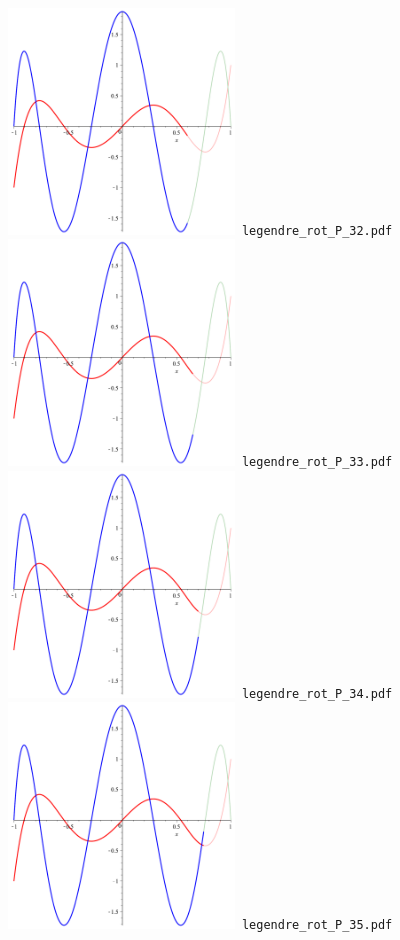 \documentclass[a4paper]{amsart}
\begin{document}
\includegraphics[width=6cm]{legendre_rot_P_32.pdf}\verb+ legendre_rot_P_32.pdf+\\
\includegraphics[width=6cm]{legendre_rot_P_33.pdf}\verb+ legendre_rot_P_33.pdf+\\
\includegraphics[width=6cm]{legendre_rot_P_34.pdf}\verb+ legendre_rot_P_34.pdf+\\
\includegraphics[width=6cm]{legendre_rot_P_35.pdf}\verb+ legendre_rot_P_35.pdf+\\
\end{document}
